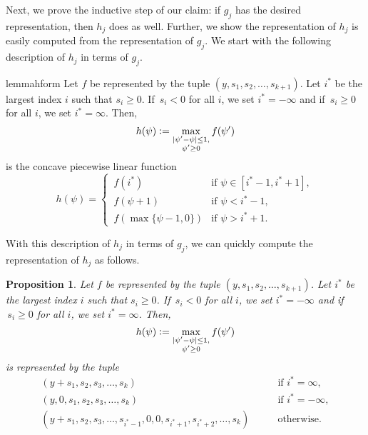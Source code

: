 \documentclass[10pt]{article}
\newtheorem{proposition}{Proposition}
\newcommand{\defeq}{\vcentcolon=}
\begin{document}
Next, we prove the inductive step of our claim: if $g_j$ has the desired representation, 
then $h_j$ does as well. Further,
we show the representation of $h_j$ is easily computed from the representation of $g_j$. 
We start with the following description of $h_j$ in terms of $g_j$.
\begin{restatable}{lemma}{hform}
\label{lemma:h_form}
Let $f$ be represented by the tuple $(y, s_1, s_2, \ldots, s_{k + 1})$. 
Let $i^*$ be the largest index $i$ such that $s_i \geq 0$. If $\,s_i < 0$ for all $i$, we set $i^* = -\infty$ and 
if $\,s_i \geq 0$ for all $i$, we set $i^* = \infty$. Then,
\[h(\psi) \defeq \max_{\substack{\lvert \psi' - \psi \rvert \leq 1,\\\psi' \geq 0}} f(\psi')\] is the concave
piecewise linear function
\begin{equation}
    \label{eq:h_form}
    h(\psi) = \begin{cases}
        \,f(i^*) &\text{if } \psi \in [i^* - 1, i^* + 1],\\
        \,f(\psi + 1) &\text{if } \psi < i^* - 1,\\
        \,f(\max\{\psi - 1, 0\}) &\text{if } \psi > i^* + 1.
    \end{cases}
\end{equation}
\end{restatable}
With this description of $h_j$ in terms of $g_j$, we can quickly compute the representation of $h_j$ as 
follows.
\begin{proposition}
    \label{prop:h_form}
    Let $f$ be represented by the tuple $(y, s_1, s_2, \ldots, s_{k + 1})$. Let $i^*$ be the largest index $i$ such that $s_i \geq 0$. 
    If $\,s_i < 0$ for all $i$, we set $i^* = -\infty$ and if $\,s_i \geq 0$ for all $i$, we set $i^* = \infty$.
    Then, \[h(\psi) \defeq \max_{\substack{\lvert \psi' - \psi \rvert \leq 1,\\\psi' \geq 0}} f(\psi')\]
    is represented by the tuple
    \begin{align*}
        (y + s_1, s_2, s_3, \ldots, s_k) \qquad&\text{if } i^* = \infty,\\
        (y, 0, s_1, s_2, s_3, \ldots, s_k) \qquad&\text{if } i^* = -\infty,\\
        (y + s_1, s_2, s_3, \ldots, s_{i^* - 1}, 0, 0, s_{i^* + 1}, s_{i^* + 2}, \ldots, s_k) \qquad&\text{otherwise}.
    \end{align*}
\end{proposition}
\end{document}
